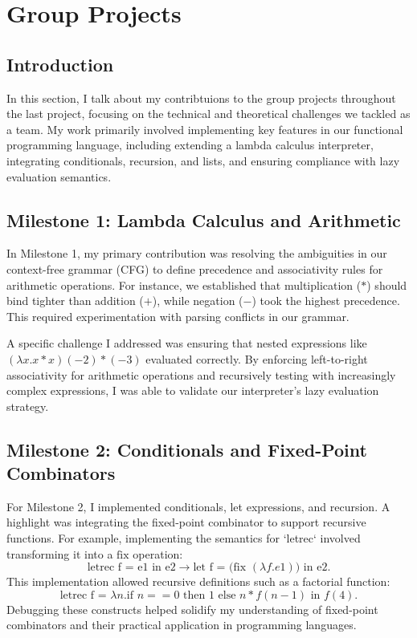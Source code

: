 \documentclass{article}
\begin{document}
\section{Group Projects}
\label{sec:group_projects}

\subsection*{Introduction}
In this section, I talk about my contribtuions to the group projects throughout the last project, focusing on the technical and theoretical challenges we tackled as a team. My work primarily involved implementing key features in our functional programming language, including extending a lambda calculus interpreter, integrating conditionals, recursion, and lists, and ensuring compliance with lazy evaluation semantics.

\subsection{Milestone 1: Lambda Calculus and Arithmetic}
In Milestone 1, my primary contribution was resolving the ambiguities in our context-free grammar (CFG) to define precedence and associativity rules for arithmetic operations. For instance, we established that multiplication (\(*\)) should bind tighter than addition (\(+\)), while negation (\(-\)) took the highest precedence. This required experimentation with parsing conflicts in our grammar. 

A specific challenge I addressed was ensuring that nested expressions like \((\lambda x.x * x) (-2) * (-3)\) evaluated correctly. By enforcing left-to-right associativity for arithmetic operations and recursively testing with increasingly complex expressions, I was able to validate our interpreter's lazy evaluation strategy. 

\subsection{Milestone 2: Conditionals and Fixed-Point Combinators}
For Milestone 2, I implemented conditionals, let expressions, and recursion. A highlight was integrating the fixed-point combinator to support recursive functions. For example, implementing the semantics for `letrec` involved transforming it into a \(\text{fix}\) operation:
\[
\text{letrec f = e1 in e2} \rightarrow \text{let f = (fix } (\lambda f.e1)\text{) in e2}.
\]
This implementation allowed recursive definitions such as a factorial function:
\[
\text{letrec f = } \lambda n. \text{if } n == 0 \text{ then } 1 \text{ else } n * f(n-1) \text{ in } f(4).
\]
Debugging these constructs helped solidify my understanding of fixed-point combinators and their practical application in programming languages. 
\end{document}
